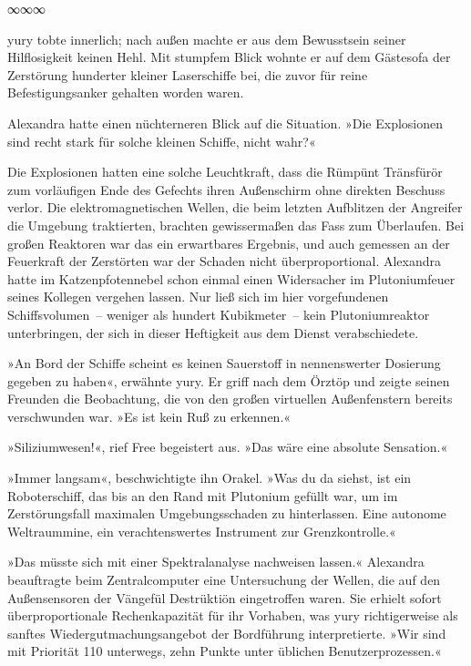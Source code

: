 \begin{center}
∞∞∞
\end{center}

yury tobte innerlich; nach außen machte er aus dem Bewusstsein seiner Hilflosigkeit keinen Hehl. Mit stumpfem Blick wohnte er auf dem Gästesofa der Zerstörung hunderter kleiner Laserschiffe bei, die zuvor für reine Befestigungsanker gehalten worden waren.

Alexandra hatte einen nüchterneren Blick auf die Situation. »Die Explosionen sind recht stark für solche kleinen Schiffe, nicht wahr?«

Die Explosionen hatten eine solche Leuchtkraft, dass die Rümpünt Tränsfürör zum vorläufigen Ende des Gefechts ihren Außenschirm ohne direkten Beschuss verlor. Die elektromagnetischen Wellen, die beim letzten Aufblitzen der Angreifer die Umgebung traktierten, brachten gewissermaßen das Fass zum Überlaufen. Bei großen Reaktoren war das ein erwartbares Ergebnis, und auch gemessen an der Feuerkraft der Zerstörten war der Schaden nicht überproportional. Alexandra hatte im Katzenpfotennebel schon einmal einen Widersacher im Plutoniumfeuer seines Kollegen vergehen lassen. Nur ließ sich im hier vorgefundenen Schiffsvolumen~– weniger als hundert Kubikmeter~– kein Plutoniumreaktor unterbringen, der sich in dieser Heftigkeit aus dem Dienst verabschiedete.

»An Bord der Schiffe scheint es keinen Sauerstoff in nennenswerter Dosierung gegeben zu haben«, erwähnte yury. Er griff nach dem Örztöp und zeigte seinen Freunden die Beobachtung, die von den großen virtuellen Außenfenstern bereits verschwunden war. »Es ist kein Ruß zu erkennen.«

»Siliziumwesen!«, rief Free begeistert aus. »Das wäre eine absolute Sensation.«

»Immer langsam«, beschwichtigte ihn Orakel. »Was du da siehst, ist ein Roboterschiff, das bis an den Rand mit Plutonium gefüllt war, um im Zerstörungsfall maximalen Umgebungsschaden zu hinterlassen. Eine autonome Weltraummine, ein verachtenswertes Instrument zur Grenzkontrolle.«

»Das müsste sich mit einer Spektralanalyse nachweisen lassen.« Alexandra beauftragte beim Zentralcomputer eine Untersuchung der Wellen, die auf den Außensensoren der Vängefül Destrüktiön eingetroffen waren. Sie erhielt sofort überproportionale Rechenkapazität für ihr Vorhaben, was yury richtigerweise als sanftes Wiedergutmachungsangebot der Bordführung interpretierte. »Wir sind mit Priorität 110 unterwegs, zehn Punkte unter üblichen Benutzerprozessen.«

